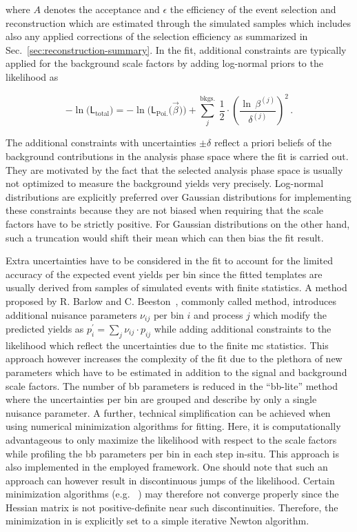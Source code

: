 where $A$ denotes the acceptance and $\epsilon$ the efficiency of the event selection and reconstruction which are estimated through the simulated samples which includes also any applied corrections of the selection efficiency as summarized in Sec.~\ref{sec:reconstruction-summary}. In the fit, additional constraints are typically applied for the background scale factors by adding log-normal priors to the likelihood as

\begin{equation}
-\ln\Big(\mathsf{L}_\mathrm{total}\Big)=-\ln\Big(\mathsf{L}_\mathrm{Poi.}\big(\vec{\beta}\big)\Big)+\sum_{j}^\mathrm{bkgs.}~\frac{1}{2}\cdot\left(\frac{\ln\,\beta^{(j)}}{\delta^{(j)}}\right)^{2}\,.
\end{equation}

The additional constraints with uncertainties $\pm\delta$ reflect a priori beliefs of the background contributions in the analysis phase space where the fit is carried out. They are motivated by the fact that the selected analysis phase space is usually not optimized to measure the background yields very precisely. Log-normal distributions are explicitly preferred over Gaussian distributions for implementing these constraints because they are not biased when requiring that the scale factors have to be strictly positive. For Gaussian distributions on the other hand, such a truncation would shift their mean which can then bias the fit result.

Extra uncertainties have to be considered in the fit to account for the limited accuracy of the expected event yields per bin since the fitted templates are usually derived from samples of simulated events with finite statistics. A method proposed by R. Barlow and C. Beeston~\cite{Barlow:1993dm}, commonly called  method, introduces additional nuisance parameters $\nu_{ij}$ per bin $i$ and process $j$ which 
modify the predicted yields as $p_{i}^\prime=\sum_{j}\nu_{ij}\cdot p_{ij}$ while adding additional constraints to the likelihood which reflect the uncertainties due to the finite \gls{mc} statistics. This approach however increases the complexity of the fit due to the plethora of new parameters which have to be estimated in addition to the signal and background scale factors. The number of \gls{bb} parameters is reduced in the ``\gls{bb}-lite'' method~\cite{Conway:2011in} where the uncertainties per bin are grouped and describe by only a single nuisance parameter. A further, technical simplification can be achieved when using numerical minimization algorithms for fitting. Here, it is computationally advantageous to only maximize the likelihood with respect to the scale factors while profiling the \gls{bb} parameters per bin in each step in-situ. This approach is also implemented in the employed \THETA framework. One should note that such an approach can however result in discontinuous jumps of the likelihood. Certain minimization algorithms (e.g. \MINUIT[format=hyperbf]~\cite{James:1975dr}) may therefore not converge properly since the Hessian matrix is not positive-definite near such discontinuities. Therefore, the minimization in \THETA is explicitly set to a simple iterative Newton algorithm.



